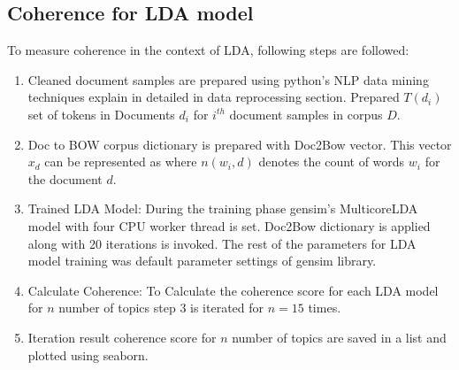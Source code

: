 \documentclass[sn-mathphys,Numbered]{sn-jnl}%
\theoremstyle{thmstyleone}%
\theoremstyle{thmstyletwo}%
\theoremstyle{thmstylethree}%
\begin{document}
\subsection{Coherence for LDA model}
To measure coherence in the context of LDA, following steps are
followed:

\begin{enumerate}
\def\labelenumi{\arabic{enumi}.}
\item
  Cleaned document samples are prepared using python's NLP data mining
  techniques explain in detailed in data reprocessing section. Prepared
  \(T\left( d_{i} \right)\) set of tokens in Documents \(d_{i}\) for
  \(i^{th}\) document samples in corpus \(D\).
\item
  Doc to BOW corpus dictionary is prepared with Doc2Bow vector. This
  vector \(x_{d}\) can be represented as where
  \(n\left( w_{i},d \right)\) denotes the count of words \(w_{i}\) for
  the document \(d\).
\item
  Trained LDA Model: During the training phase gensim's MulticoreLDA
  model with four CPU worker thread is set. Doc2Bow dictionary is
  applied along with 20 iterations is invoked. The rest of the
  parameters for LDA model training was default parameter settings of
  gensim library.
\item
  Calculate Coherence: To Calculate the coherence score for each LDA
  model for \(n\) number of topics step 3 is iterated for \(n = 15\)
  times.
\item
  Iteration result coherence score for \(n\) number of topics are saved
  in a list and plotted using seaborn.
\end{enumerate}
\end{document}
